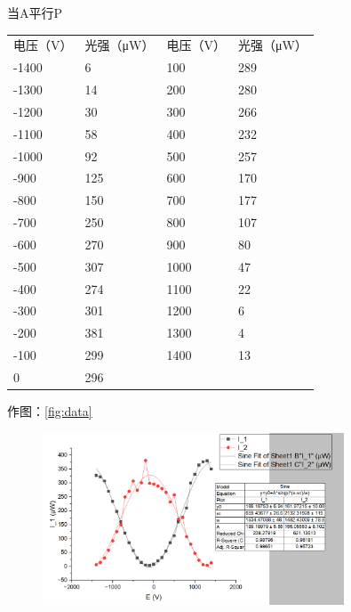 \documentclass[font=default]{mpltx}
\begin{document}
当A平行P

\begin{table}[]
\begin{tabular}{llll}
电压（V）                      & 光强（μW）                   & 电压（V） & 光强（μW） \\
-1400                      & 6                        & 100   & 289    \\
-1300                      & 14                       & 200   & 280    \\
-1200                      & 30                       & 300   & 266    \\
-1100                      & 58                       & 400   & 232    \\
-1000                      & 92                       & 500   & 257    \\
-900                       & 125                      & 600   & 170    \\ \cline{1-2}
\multicolumn{1}{|l|}{-800} & \multicolumn{1}{l|}{150} & 700   & 177    \\ \cline{1-2}
-700                       & 250                      & 800   & 107    \\
-600                       & 270                      & 900   & 80     \\
-500                       & 307                      & 1000  & 47     \\
-400                       & 274                      & 1100  & 22     \\
-300                       & 301                      & 1200  & 6      \\
-200                       & 381                      & 1300  & 4      \\
-100                       & 299                      & 1400  & 13     \\
0                          & 296                      &       &       
\end{tabular}
\end{table}

作图：\autoref{fig:data}

\begin{figure}
  \centering
  \includegraphics[width=0.8\textwidth]{fig/data.png}
  \label{fig:data}
\end{figure}
\end{document}
